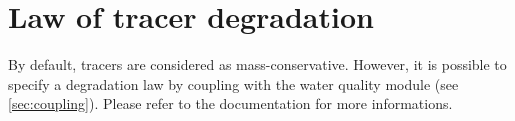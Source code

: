 \section{Law of tracer degradation}

By default,  tracers are considered as mass-conservative.
However, it is possible to specify a degradation law
by coupling  with the \waqtel water quality module
(see \ref{sec:coupling}).
Please refer to the \waqtel documentation for more informations.




